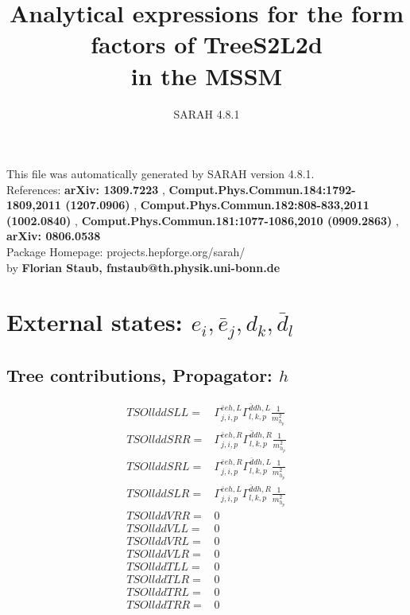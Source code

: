 \documentclass[A4,landscape]{article}
\begin{document}
\title{Analytical expressions for the form factors of TreeS2L2d\\ in the MSSM } 
 \author{SARAH 4.8.1} 
 \maketitle 
 \vspace{10cm} 
This file was automatically generated by SARAH version 4.8.1.  \\ 
References: {\bf arXiv: 1309.7223 }, {\bf Comput.Phys.Commun.184:1792-1809,2011 (1207.0906) }, {\bf Comput.Phys.Commun.182:808-833,2011 (1002.0840) }, {\bf Comput.Phys.Commun.181:1077-1086,2010 (0909.2863) }, {\bf arXiv: 0806.0538 } \\ 
Package Homepage: projects.hepforge.org/sarah/ \\ 
by {\bf Florian Staub, fnstaub@th.physik.uni-bonn.de} 
 \pagebreak 
 \tableofcontents 
 \pagebreak 
\section{External states: ${e_{{i}}, \bar{e}_{{j}}, d_{{k}}, \bar{d}_{{l}}}$} 
\subsection{Tree contributions, Propagator: $h$} 

\begin{align} 
  TSOllddSLL= & \Gamma^{\bar{e}e h ,L}_{j, i, p} \Gamma^{\bar{d}d h ,L}_{l, k, p} \frac{1}{m^2_{h_{{p}}}} \\ 
  TSOllddSRR= & \Gamma^{\bar{e}e h ,R}_{j, i, p} \Gamma^{\bar{d}d h ,R}_{l, k, p} \frac{1}{m^2_{h_{{p}}}} \\ 
  TSOllddSRL= & \Gamma^{\bar{e}e h ,R}_{j, i, p} \Gamma^{\bar{d}d h ,L}_{l, k, p} \frac{1}{m^2_{h_{{p}}}} \\ 
  TSOllddSLR= & \Gamma^{\bar{e}e h ,L}_{j, i, p} \Gamma^{\bar{d}d h ,R}_{l, k, p} \frac{1}{m^2_{h_{{p}}}} \\ 
  TSOllddVRR= & 0 \\ 
  TSOllddVLL= & 0 \\ 
  TSOllddVRL= & 0 \\ 
  TSOllddVLR= & 0 \\ 
  TSOllddTLL= & 0 \\ 
  TSOllddTLR= & 0 \\ 
  TSOllddTRL= & 0 \\ 
  TSOllddTRR= & 0 \\ 
\end{align} 
\end{document}
